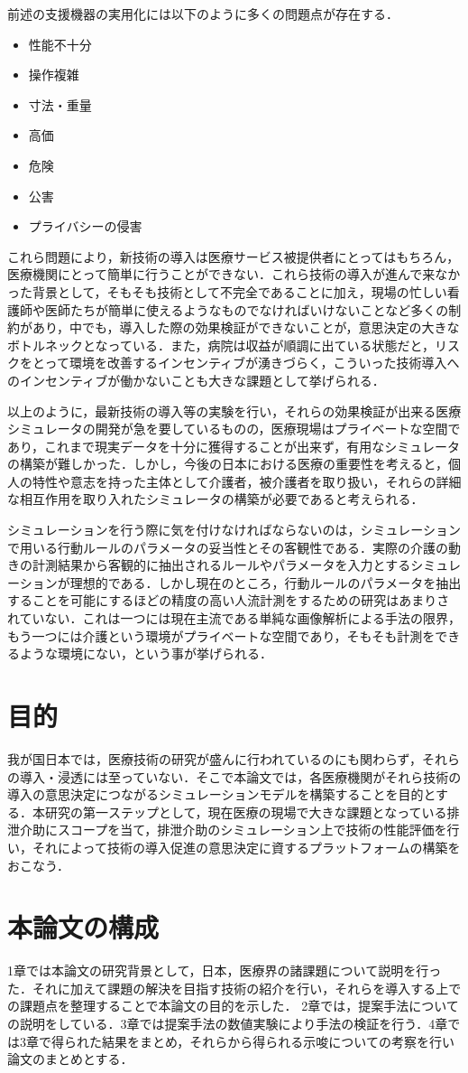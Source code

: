 前述の支援機器の実用化には以下のように多くの問題点が存在する．

\begin{itemize}
 \item 性能不十分
 \item 操作複雑
 \item 寸法・重量
 \item 高価
 \item 危険
 \item 公害
 \item プライバシーの侵害
\end{itemize}

これら問題により，新技術の導入は医療サービス被提供者にとってはもちろん，医療機関にとって簡単に行うことができない．これら技術の導入が進んで来なかった背景として，そもそも技術として不完全であることに加え，現場の忙しい看護師や医師たちが簡単に使えるようなものでなければいけないことなど多くの制約があり，中でも，導入した際の効果検証ができないことが，意思決定の大きなボトルネックとなっている．また，病院は収益が順調に出ている状態だと，リスクをとって環境を改善するインセンティブが湧きづらく，こういった技術導入へのインセンティブが働かないことも大きな課題として挙げられる．

以上のように，最新技術の導入等の実験を行い，それらの効果検証が出来る医療シミュレータの開発が急を要しているものの，医療現場はプライベートな空間であり，これまで現実データを十分に獲得することが出来ず，有用なシミュレータの構築が難しかった．しかし，今後の日本における医療の重要性を考えると，個人の特性や意志を持った主体として介護者，被介護者を取り扱い，それらの詳細な相互作用を取り入れたシミュレータの構築が必要であると考えられる．

シミュレーションを行う際に気を付けなければならないのは，シミュレーションで用いる行動ルールのパラメータの妥当性とその客観性である．実際の介護の動きの計測結果から客観的に抽出されるルールやパラメータを入力とするシミュレーションが理想的である．しかし現在のところ，行動ルールのパラメータを抽出することを可能にするほどの精度の高い人流計測をするための研究はあまりされていない．これは一つには現在主流である単純な画像解析による手法の限界，もう一つには介護という環境がプライベートな空間であり，そもそも計測をできるような環境にない，という事が挙げられる．

\section{目的}

我が国日本では，医療技術の研究が盛んに行われているのにも関わらず，それらの導入・浸透には至っていない．そこで本論文では，各医療機関がそれら技術の導入の意思決定につながるシミュレーションモデルを構築することを目的とする．本研究の第一ステップとして，現在医療の現場で大きな課題となっている排泄介助にスコープを当て，排泄介助のシミュレーション上で技術の性能評価を行い，それによって技術の導入促進の意思決定に資するプラットフォームの構築をおこなう．

\section{本論文の構成}

1章では本論文の研究背景として，日本，医療界の諸課題について説明を行った．それに加えて課題の解決を目指す技術の紹介を行い，それらを導入する上での課題点を整理することで本論文の目的を示した．
2章では，提案手法についての説明をしている．3章では提案手法の数値実験により手法の検証を行う．4章では3章で得られた結果をまとめ，それらから得られる示唆についての考察を行い論文のまとめとする．
